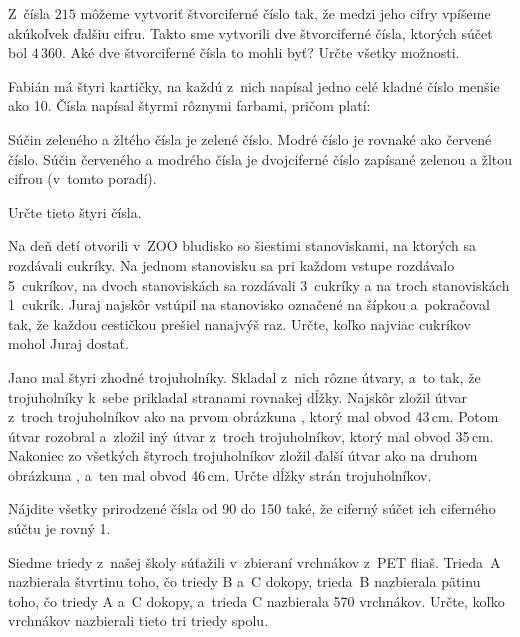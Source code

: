 {%
Z~čísla $215$ môžeme vytvoriť štvorciferné číslo tak, že medzi jeho cifry vpíšeme
akúkoľvek ďalšiu cifru. Takto sme vytvorili dve štvorciferné čísla, ktorých súčet bol $4\,360$.
Aké dve štvorciferné čísla to mohli byť? Určte všetky možnosti.}

{%
Fabián má štyri kartičky, na každú z~nich napísal jedno celé kladné číslo
menšie ako 10. Čísla napísal štyrmi rôznymi farbami, pričom platí:
\begin{itemize}
\iitem Súčin zeleného a žltého čísla je zelené číslo.
\iitem Modré číslo je rovnaké ako červené číslo.
\iitem Súčin červeného a modrého čísla je dvojciferné číslo zapísané zelenou
a žltou cifrou (v~tomto poradí).
\end{itemize}
Určte tieto štyri čísla.
}

{%
Na deň detí otvorili v~ZOO bludisko so šiestimi stanoviskami, na ktorých sa
rozdávali cukríky. Na jednom stanovisku sa pri každom vstupe rozdávalo 5~cukríkov, na dvoch
stanoviskách sa rozdávali 3~cukríky a na troch stanoviskách 1~cukrík.
Juraj najskôr vstúpil na stanovisko označené \ifobrazkyvedla\else{}na \obr{} \fi{}šípkou a~pokračoval tak, že
každou cestičkou prešiel nanajvýš raz.
Určte, koľko najviac cukríkov mohol Juraj dostať.
\ifobrazkyvedla\else{}\fi%
}

{%
Jano mal štyri zhodné trojuholníky.
Skladal z~nich rôzne útvary, a~to tak, že trojuholníky k~sebe prikladal
stranami rovnakej dĺžky.
Najskôr zložil útvar z~troch trojuholníkov ako na \ifobrazkyvedla{}prvom obrázku\else{}na \obr{}\fi{}, ktorý mal obvod
43\,cm.
Potom útvar rozobral a~zložil iný útvar z~troch trojuholníkov, ktorý mal obvod
35\,cm.
Nakoniec zo všetkých štyroch trojuholníkov zložil ďalší útvar ako na \ifobrazkyvedla{}druhom obrázku\else{}na \obr{}\fi{},
a~ten mal obvod 46\,cm.
Určte dĺžky strán trojuholníkov.
%
}

{%
Nájdite všetky prirodzené čísla od 90 do 150 také, že ciferný
súčet ich ciferného súčtu je rovný 1.}

{%
Siedme triedy z~našej školy súťažili v~zbieraní vrchnákov z~PET fliaš.
Trieda~A nazbierala štvrtinu toho, čo triedy B a~C dokopy,
trieda~B nazbierala pätinu toho, čo triedy A a~C dokopy,
a~trieda C nazbierala 570 vrchnákov.
Určte, koľko vrchnákov nazbierali tieto tri triedy spolu.
}


